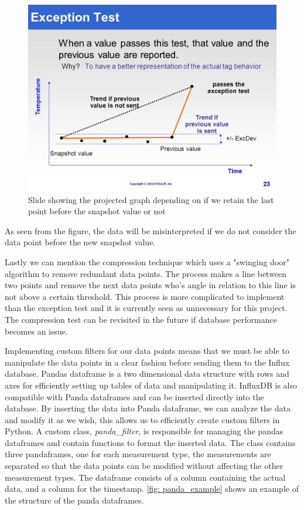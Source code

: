\documentclass[main.tex]{subfiles}
\begin{document}
\begin{figure}[!htpb]
    \centering
    \includegraphics[width=12cm, scale=4]{images/osisoft_last_point.jpg}
    \caption{Slide showing the projected graph depending on if we retain the last point before the snapshot value or not\cite{osisoft_exception}}
    \label{fig: osisoft_last_point}
\end{figure}
\FloatBarrier 
 
 As seen from the figure, the data will be misinterpreted if we do not consider the data point before the new snapshot value. 
 
 Lastly we can mention the compression technique which uses a "swinging door" algorithm to remove redundant data points. The process makes a line between two points and remove the next data points who's angle in relation to this line is not above a certain threshold. This process is more complicated to implement than the exception test and it is currently seen as unnecessary for this project. The compression test can be revisited in the future if database performance becomes an issue.
 
 Implementing custom filters for our data points means that we must be able to manipulate the data points in a clear fashion before sending them to the Influx database. Pandas dataframe is a two dimensional data structure with rows and axes for efficiently setting up tables of data and manipulating it. InfluxDB is also compatible with Panda dataframes and can be inserted directly into the database. By inserting the data into Panda dataframe, we can analyze the data and modify it as we wish, this allows us to efficiently create custom filters in Python. A custom class, \textit{panda\_filter}, is responsible for managing the pandas dataframes and contain functions to format the inserted data. The class contains three pandaframes, one for each measurement type, the measurements are separated so that the data points can be modified without affecting the other measurement types. The dataframe consists of a column containing the actual data, and a column for the timestamp. \autoref{fig: panda_example} shows an example of the structure of the panda dataframes. 
 
\end{document}
